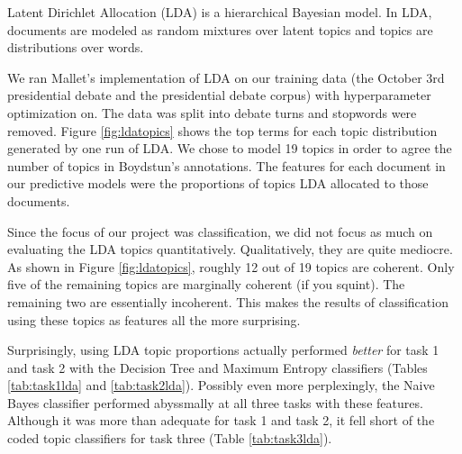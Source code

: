 
Latent Dirichlet Allocation (LDA) is a hierarchical Bayesian model.
In LDA, documents are modeled as random mixtures over latent topics and topics are distributions over words.

We ran Mallet's implementation of LDA on our training data (the October 3rd presidential debate and the presidential debate corpus) with hyperparameter optimization on.
The data was split into debate turns and stopwords were removed.
Figure \ref{fig:ldatopics} shows the top terms for each topic distribution generated by one run of LDA.
We chose to model 19 topics in order to agree the number of topics in Boydstun's annotations.
The features for each document in our predictive models were the proportions of topics LDA allocated to those documents.

Since the focus of our project was classification, we did not focus as much on evaluating the LDA topics quantitatively.
Qualitatively, they are quite mediocre.
As shown in Figure \ref{fig:ldatopics}, roughly 12 out of 19 topics are coherent.
Only five of the remaining topics are marginally coherent (if you squint).
The remaining two are essentially incoherent.
This makes the results of classification using these topics as features all the more surprising.

Surprisingly, using LDA topic proportions actually performed \textit{better} for task 1 and task 2 with the Decision Tree and Maximum Entropy classifiers (Tables \ref{tab:task1lda} and \ref{tab:task2lda}).
Possibly even more perplexingly, the Naive Bayes classifier performed abyssmally at all three tasks with these features.
Although it was more than adequate for task 1 and task 2, it fell short of the coded topic classifiers for task three (Table \ref{tab:task3lda}).


